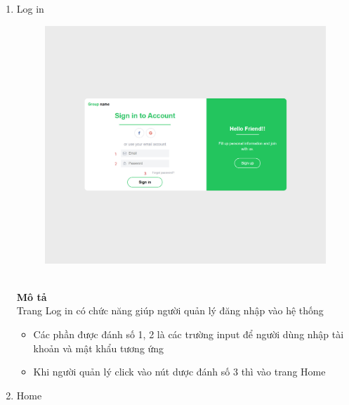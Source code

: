 \documentclass[a4paper]{article}
\begin{document}
\begin{enumerate}
   \item Log in
    \\
                \begin{figure}[!h]
    \begin{center}
      \includegraphics[width=5in]{Image/Log_in.png}
    \end{center}
\end{figure} 
\\
    \textbf{Mô tả}\\
        Trang Log in có chức năng giúp người quản lý đăng nhập vào hệ thống
    \begin{itemize}
    \item Các phần được đánh số 1, 2 là các trường input để người dùng nhập tài khoản và mật khẩu tương ứng
    \item Khi người quản lý click vào nút dược đánh số 3 thì vào trang Home 
    \end{itemize}
     \newpage
    \item Home
    \\
    \begin{figure}[!h]
        \centering

\end{figure}
\end{enumerate}
\end{document}
